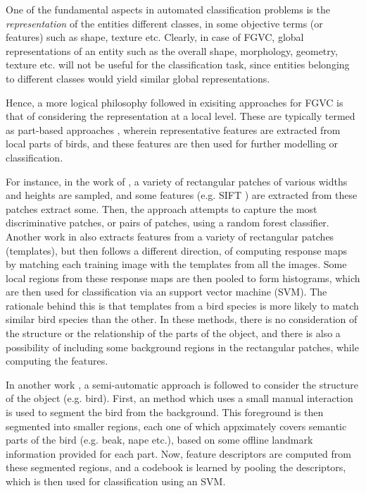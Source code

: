 \documentclass{article}
\begin{document}
One of the fundamental aspects in automated classification problems is the \emph{representation} of the entities different classes, in some objective terms (or features) such as shape, texture etc. Clearly, in case of FGVC, global representations of an entity such as the overall shape, morphology, geometry, texture etc. will not be useful for the classification task, since entities belonging to different classes would yield similar global representations. 

Hence, a more logical philosophy followed in exisiting approaches for FGVC is that of considering the representation at a local level. These are typically termed as part-based approaches \cite{}, wherein representative features are extracted from local parts of birds, and these features are then used for further modelling or classification.  

For instance, in the work of \cite{}, a variety of rectangular patches of various widths and heights are sampled, and some features (e.g. SIFT \cite{}) are extracted from these patches extract some. Then, the approach attempts to capture the most discriminative patches, or pairs of patches, using a random forest classifier. Another work in \cite{} also extracts features from a variety of rectangular patches (templates), but then follows a different direction, of computing response maps by matching each training image with the templates from all the images. Some local regions from these response maps are then pooled to form histograms, which are then used for classification via an support vector machine (SVM). The rationale behind this is that templates from a bird species is more likely to match similar bird species than the other. In these methods, there is no consideration of the structure or the relationship of the parts of the object, and there is also a possibility of including some background regions in the rectangular patches, while computing the features. 

In another work \cite{}, a semi-automatic approach is followed to consider the structure of the object (e.g. bird). First, an method which uses a small manual interaction is used to segment the bird from the background. This foreground is then segmented into smaller regions, each one of which appximately covers semantic parts of the bird (e.g. beak, nape etc.), based on some offline landmark information provided for each part. Now, feature descriptors are computed from these segmented regions, and a codebook is learned by pooling the descriptors, which is then used for classification using an SVM.
     
\end{document}
